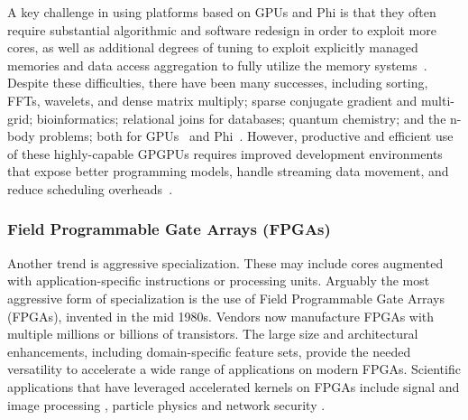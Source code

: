 A key challenge in using platforms based on GPUs and Phi is that they often require substantial algorithmic and software redesign in order to exploit more cores, as well as additional degrees of tuning to exploit explicitly managed memories and data access aggregation to fully utilize the memory systems~\cite{Yang2007:gpu,Vuduc:2010kx}.
Despite these difficulties, there have been many successes, including sorting, FFTs,
wavelets, and dense matrix multiply; sparse conjugate gradient and
multi-grid; bioinformatics; relational joins for databases; quantum
chemistry; and the n-body problems; both for GPUs~\cite{NVIDIA.cuda.community,Choi:2014kl,Sao:2014wo} and Phi~\cite{Aluru:2014cg,Sarje:2013ap,Liu:2013sp,Liu:2014bs}.
However, productive and efficient use of these highly-capable GPGPUs
requires improved development environments that expose better
programming models, handle streaming data movement, and reduce
scheduling overheads~\cite{AugThiNamWac11CCPE}.

\subsubsection{Field Programmable Gate Arrays (FPGAs)}
Another trend is aggressive specialization.
These may include cores augmented with application-specific instructions or processing units.
Arguably the most aggressive form of specialization is the use of Field Programmable Gate Arrays (FPGAs), invented in the mid 1980s.
Vendors now manufacture FPGAs with multiple millions or billions of transistors.
The large size and architectural enhancements, 
including domain-specific feature sets, provide the needed versatility
to accelerate a wide range of applications on modern FPGAs. 
Scientific applications that have leveraged accelerated kernels on FPGAs include signal
and image processing \cite{Stitt:2011:E2EFPGA}, particle physics \cite{liu:2011:hades} and network
security \cite{jiang:2011:tvlsi}.

